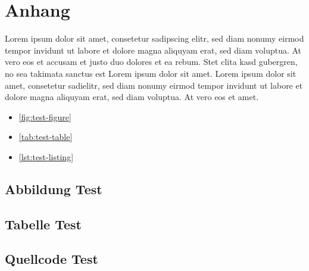 \thispagestyle{plain}

\section{Anhang}\label{apdx}

Lorem ipsum dolor sit amet, consetetur sadipscing elitr, sed diam nonumy eirmod
tempor invidunt ut labore et dolore magna aliquyam erat, sed diam voluptua. At
vero eos et accusam et justo duo dolores et ea rebum. Stet clita kasd gubergren,
no sea takimata sanctus est Lorem ipsum dolor sit amet. Lorem ipsum dolor sit
amet, consetetur sadielitr, sed diam nonumy eirmod tempor invidunt ut labore et
dolore magna aliquyam erat, sed diam voluptua. At vero eos et amet.

\begin{itemize}
    \item \autoref{fig:test-figure}
    \item \autoref{tab:test-table}
    \item \autoref{lst:test-listing}
\end{itemize}

\subsection{Abbildung Test}\label{apdx:figures}


\clearpage

\subsection{Tabelle Test}\label{apdx:tables}


\clearpage

\subsection{Quellcode Test}\label{apdx:listings}


\clearpage